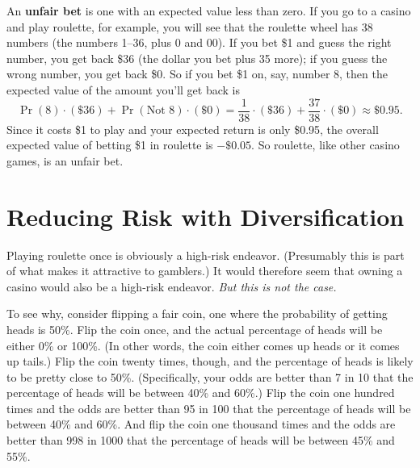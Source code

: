 An \textbf{unfair bet} is one with an expected value less than zero. If you go to a casino and play roulette, for example, you will see that the roulette wheel has 38 numbers (the numbers 1--36, plus 0 and 00). If you bet \$1 and guess the right number, you get back \$36 (the dollar you bet plus 35 more); if you guess the wrong number, you get back \$0. So if you bet \$1 on, say, number 8, then the expected value of the amount you'll get back is
\[
\Pr(8) \cdot (\$36) + \Pr(\mbox{Not $8$}) \cdot (\$0) = \frac{1}{38}
\cdot (\$36) + \frac{37}{38} \cdot (\$0) \approx \$0.95.
\]
%
Since it costs \$1 to play and your expected return is only \$0.95, the overall expected value of betting \$1 in roulette  is $-\$0.05$. So roulette, like other casino games, is an unfair bet.



\section{Reducing Risk with Diversification}\label{diversification}

Playing roulette once is obviously a high-risk endeavor. (Presumably this is part of what makes it attractive to gamblers.)  It would therefore seem that owning a casino would also be a high-risk endeavor. \emph{But this is not the case.}

To see why, consider flipping a fair coin, one where the probability of getting heads is 50\%. Flip the coin once, and the actual percentage of heads will be either 0\% or 100\%. (In other words, the coin either comes up heads or it comes up tails.) Flip the coin twenty times, though, and the percentage of heads is likely to be pretty close to 50\%. (Specifically, your odds are better than 7 in 10 that the percentage of heads will be between 40\% and 60\%.) Flip the coin one hundred times and the odds are better than 95 in 100 that the percentage of heads will be between 40\% and 60\%. And flip the coin one thousand times and the odds are better than 998 in 1000 that the percentage of heads will be between 45\% and 55\%.

